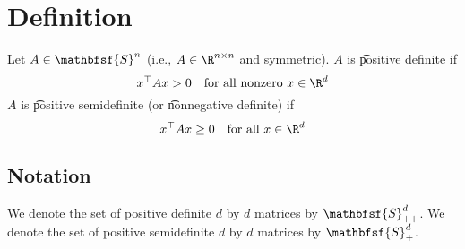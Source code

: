 


\section*{Definition}

Let $A \in \mathbfsf{S} ^n$ (i.e., $A \in \R ^{n \times  n}$ and symmetric).
$A$ is \t{positive definite} if
\[
x^\top  A x > 0 \quad \text{for all nonzero } x \in \R ^d
\]
$A$ is \t{positive semidefinite} (or \t{nonnegative definite}) if
\[
x^\top  A x \geq 0 \quad \text{for all } x \in \R ^d
\]

\subsection*{Notation}

We denote the set of positive definite $d$ by $d$ matrices by $\mathbfsf{S} _{++}^d$.
We denote the set of positive semidefinite $d$ by $d$ matrices by $\mathbfsf{S} _{+}^d$.

\blankpage
